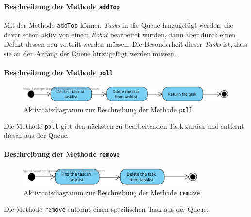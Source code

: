 			\paragraph{Beschreibung der Methode \texttt{addTop}}		
			
			Mit der Methode \texttt{addTop} können \textit{Tasks} in die Queue hinzugefügt werden, die davor schon aktiv von einem \textit{Robot} bearbeitet wurden, dann aber durch einen Defekt dessen neu verteilt werden müssen. 
			Die Besonderheit dieser \textit{Tasks} ist, dass sie an den Anfang der Queue hinzugefügt werden müssen.
				
			\paragraph{Beschreibung der Methode \texttt{poll}}		
			\begin{figure}[H]
			\centering
			\includegraphics[width=1\textwidth]{img/2-Entwurf-poll}
			\caption{Aktivitätsdiagramm zur Beschreibung der Methode \texttt{poll}}
			\label{SequenzQueuePoll}
			\end{figure}			
			
			Die Methode \texttt{poll} gibt den nächsten zu bearbeitenden Task zurück und entfernt diesen aus der Queue.
				
			\paragraph{Beschreibung der Methode \texttt{remove}}		
			\begin{figure}[H]
			\centering
			\includegraphics[width=0.85\textwidth]{img/2-Entwurf-remove}
			\caption{Aktivitätsdiagramm zur Beschreibung der Methode \texttt{remove}}
			\label{SequenzQueueRemove}
			\end{figure}			
			
			Die Methode \texttt{remove} entfernt einen spezifischen Task aus der Queue.
			
